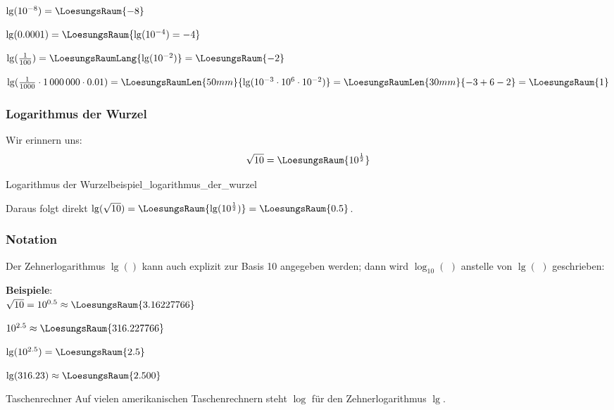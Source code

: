 $\lg(10^{-8}) = \LoesungsRaum{-8}$
\leserluft{}

$\lg(0.0001) = \LoesungsRaum{\lg(10^{-4})=-4}$

$\lg(\frac1{100}) =\LoesungsRaumLang{\lg(10^{-2}) } = \LoesungsRaum{-2}$
\leserluft{}

$\lg(\frac1{1000}\cdot{} 1\,000\,000 \cdot{} 0.01)
=\LoesungsRaumLen{50mm}{\lg(10^{-3} \cdot{} 10^6 \cdot{} 10^{-2}) } =
\LoesungsRaumLen{30mm}{-3 + 6 - 2} = \LoesungsRaum{1}$

\newpage
\subsubsection{Logarithmus der Wurzel}
Wir erinnern uns: $$\sqrt{10} =\LoesungsRaum{ 10^\frac12}$$
\begin{beispiel}{Logarithmus der
    Wurzel}{beispiel_logarithmus_der_wurzel}

  Daraus folgt direkt $\lg(\sqrt{10}) = \LoesungsRaum{\lg(10^\frac12)}  = \LoesungsRaum{0.5}$.
\end{beispiel}

\subsubsection{Notation}
Der Zehnerlogarithmus $\lg()$ kann auch explizit zur Basis 10
angegeben werden; dann wird $\log_{10}(\,\,)$ anstelle von $\lg(\,\,)$ geschrieben:

\begin{center}
\end{center}

\textbf{Beispiele}:\\


$\sqrt{10} = 10^{0.5} \approx \LoesungsRaum{3.16227766}$
\leserluft{}

$10^{2.5} \approx \LoesungsRaum{316.227766}$\\
\leserluft{}

$\lg(10^{2.5}) = \LoesungsRaum{2.5}$

\leserluft{}

$\lg(316.23) \approx \LoesungsRaum{2.500}$


\begin{bemerkung}{Taschenrechner}{}
  Auf vielen amerikanischen Taschenrechnern steht $\log$ für den Zehnerlogarithmus $\lg$.

  
  \end{bemerkung}

